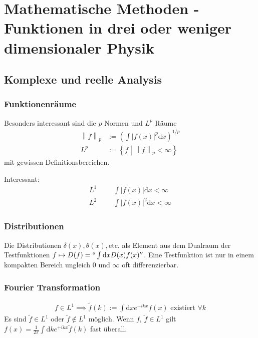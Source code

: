 \documentclass[11pt,a4paper]{report}
\newcommand{\norm}[1]{\left\lVert #1 \right\rVert}
\begin{document}
\section{Mathematische Methoden - Funktionen in drei oder weniger dimensionaler Physik}

\subsection{Komplexe und reelle Analysis}

\subsubsection{Funktionenräume}
Besonders interessant sind die $p$ Normen und $L^p$ Räume
\begin{align*}
    \norm{f}_p &:= (\int |f(x)|^p \mathrm{d}x)^{1/p} \\
    L^p & := \left\{ f \middle| \norm{f}_p < \infty \right\}
\end{align*}
mit gewissen Definitionsbereichen.

Interessant:
\begin{align*}
    L^1 &&&\int |f(x)| \mathrm{d}x < \infty \\
    L^2 &&&\int |f(x)|^2 \mathrm{d}x < \infty
\end{align*}

\subsubsection{Distributionen}

Die Distributionen $\delta(x), \theta(x), \text{etc.}$ als Element aus dem Dualraum der Testfunktionen $f \mapsto D(f) = ``\int \mathrm{d}x D(x) f(x)''$.
Eine Testfunktion ist nur in einem kompakten Bereich ungleich $0$ und $\infty$ oft differenzierbar.

\subsubsection{Fourier Transformation}

\begin{align*}
    f \in L^1 \implies \tilde{f}(k) := \int \mathrm{d}x e^{-i k x} f(x) \text{ existiert } \forall k 
\end{align*}
Es sind $\tilde{f} \in L^1$ oder $\tilde{f} \notin L^1$ möglich.
Wenn $f$, $\tilde{f} \in L^1$ gilt $f(x) = \frac{1}{2\pi} \int \mathrm{d}k e^{+ i k x} \tilde{f}(k)$ fast überall.
\end{document}
